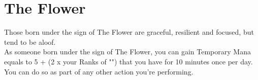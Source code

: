 \section{The Flower}\label{zodiac:flower}

Those born under the sign of The Flower are graceful, resilient and focused, but tend to be aloof.\\
As someone born under the sign of The Flower, you can gain Temporary Mana equals to 5 + (2 x your Ranks of "") that you have for 10 minutes once per day.
You can do so as part of any other action you're performing.\\